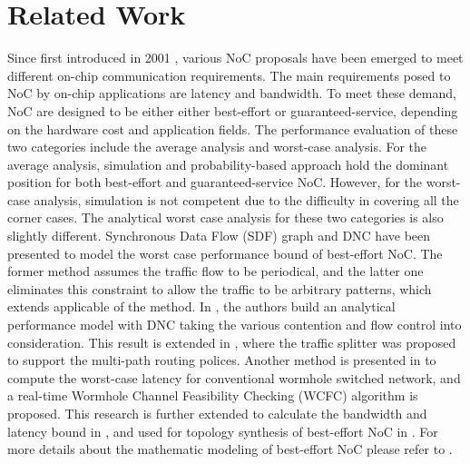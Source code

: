 \documentclass[10pt,journal]{IEEEtran}
\begin{document}
\section{Related Work}\label{related}
Since first introduced in 2001 \cite{DaTo01}, various NoC proposals have been emerged to meet different on-chip communication requirements. The main requirements posed to NoC by on-chip applications are latency and bandwidth. To meet these demand, NoC are designed to be either either best-effort or guaranteed-service, depending on the hardware cost and application fields. The performance evaluation of these two categories include the average analysis and worst-case analysis. For the average analysis, simulation and probability-based approach hold the dominant position for both best-effort and guaranteed-service NoC. However, for the worst-case analysis, simulation is not competent due to the difficulty in covering all the corner cases. The analytical worst case analysis for these two categories is also slightly different. Synchronous Data Flow (SDF) graph \cite{poplavko2003task} and DNC \cite{qian2009analysis} have been presented to model the worst case performance bound of best-effort NoC. The former method assumes the traffic flow to be periodical, and the latter one eliminates this constraint to allow the traffic to be arbitrary patterns, which extends applicable of the method. In \cite{qian2009analysis}, the authors build an analytical performance model with DNC taking the various contention and flow control into consideration. This result is extended in \cite{Du:2012:WPA:2380445.2380469}, where the traffic splitter was proposed to support the multi-path routing polices. Another method is presented in \cite{Lee:2003:RWC:846077.846083} to compute the worst-case latency for conventional wormhole switched network, and a real-time Wormhole Channel Feasibility Checking (WCFC) algorithm is proposed. This research is further extended to calculate the bandwidth and latency bound in \cite{6109240}, and used for topology synthesis of best-effort NoC in \cite{EPFL-ARTICLE-186879}. For more details about the mathematic modeling of best-effort NoC please refer to \cite{Kiasari:2013:MFP:2480741.2480755}.
\end{document}
